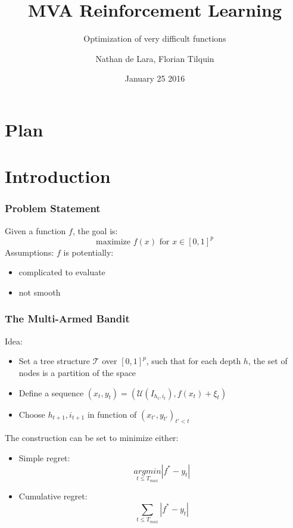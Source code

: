 \documentclass[xcolor={usenames,dvipsnames}]{beamer}
\begin{document}

\title{MVA Reinforcement Learning}
\subtitle{Optimization of very difficult functions}
\author{Nathan de Lara, Florian Tilquin}
\date{January 25 2016}


\begin{frame}
\titlepage
\end{frame}

\usebackgroundtemplate{ }

\section*{Plan}
\begin{frame}
  \tableofcontents[]
\end{frame}

\section{Introduction}
\begin{frame}
\frametitle{Problem Statement}
Given a function $f$, the goal is:
\begin{equation}
\mbox{maximize } f(x) \mbox{ for } x\in [0,1]^p
\end{equation}
Assumptions: $f$ is potentially:
\begin{itemize}
\item complicated to evaluate
\item not smooth
\end{itemize}
\end{frame}

\begin{frame}
\frametitle{The Multi-Armed Bandit}
Idea:
\begin{itemize}
\item Set a tree structure $\mathcal{T}$ over $[0,1]^p$, such that for each depth $h$, the set of nodes is a partition of the space
\item Define a sequence $(x_t,y_t)=(\mathcal{U}(I_{h_t,i_t}),f(x_t)+\xi_t)$
\item Choose $h_{t+1},i_{t+1}$ in function of $(x_{t'},y_{t'})_{t'<t}$
\end{itemize}
The construction can be set to minimize either:
\begin{itemize}
\item Simple regret: \begin{equation}
\underset{t\le T_{max}}{argmin}|f^*-y_t|
\end{equation}
\item Cumulative regret: \begin{equation}\underset{t\le T_{max}}{\sum}|f^*-y_t| \end{equation}
\end{itemize}
\end{frame}
\end{document}
